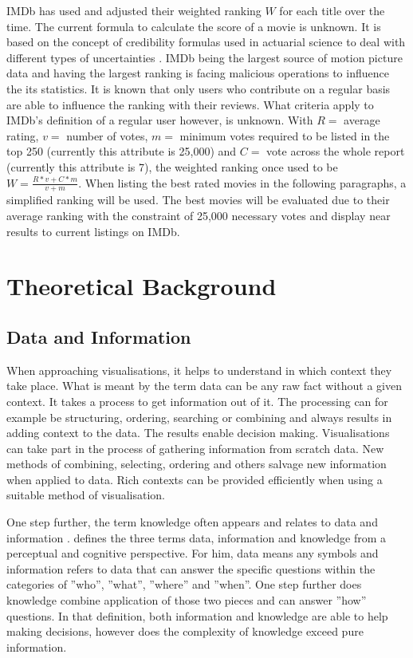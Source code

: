 IMDb has used and adjusted their weighted ranking $W$ for each title over the time. The current formula to calculate the score of a movie is unknown. It is based on the concept of credibility formulas used in actuarial science to deal with different types of uncertainties \citep{norberg2004}. IMDb being the largest source of motion picture data and having the largest ranking is facing malicious operations to influence the its statistics. It is known that only users who contribute on a regular basis are able to influence the ranking with their reviews. What criteria apply to IMDb's definition of a regular user however, is unknown. With $R = $ average rating, $v = $ number of votes, $m = $ minimum votes required to be listed in the top 250 (currently this attribute is 25,000) and $C = $ vote across the whole report (currently this attribute is 7), the weighted ranking once used to be $W=\frac{R*v + C*m}{v+m}$. When listing the best rated movies in the following paragraphs, a simplified ranking will be used. The best movies will be evaluated due to their average ranking with the constraint of 25,000 necessary votes and display near results to current listings on IMDb.

\chapter{Theoretical Background}
\section{Data and Information}
When approaching visualisations, it helps to understand in which context they take place. What is meant by the term data can be any raw fact without a given context. It takes a process to get information out of it. The processing can for example be structuring, ordering, searching or combining and always results in adding context to the data. The results enable decision making. Visualisations can take part in the process of gathering information from scratch data. New methods of combining, selecting, ordering and others salvage new information when applied to data. Rich contexts can be provided efficiently when using a suitable method of visualisation. 

One step further, the term knowledge often appears and relates to data and information \citep{chen2009}. \cite{ackhoff1989} defines the three terms data, information and knowledge from a perceptual and cognitive perspective. For him, data means any symbols and information refers to data that can answer the specific questions within the categories of ''who'', ''what'', ''where'' and ''when''. One step further does knowledge combine application of those two pieces and can answer ''how'' questions. In that definition, both information and knowledge are able to help making decisions, however does the complexity of knowledge exceed pure information. 


